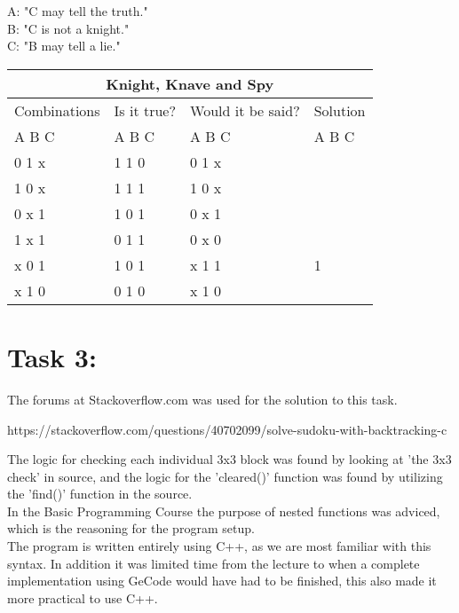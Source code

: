 \documentclass[11pt]{amsart}
\begin{document}
	A: "C may tell the truth."\\
	B: "C is not a knight."\\
	C: "B may tell a lie." \\


\begin{tabular}{ |p{3cm}||p{3cm}|p{3cm}|p{3cm}|  }
	\hline
	\multicolumn{4}{|c|}{Knight, Knave and Spy} \\
	\hline
	 Combinations & Is it true? & Would it be said? & Solution  \\ A  B  C   &   A  B  C  &   A  B  C & A  B  C \\
	\hline
	  0   1   x  	& 1	1	0   & 0 1 x	&  \\
	  1   0   x		& 1	1	1  	& 1 0 x &  \\
	  0   x   1 	&	1	0	1 	& 0 x 1	&  \\
	  1   x   1  	&	0	1	1 	& 0 x 0	&  \\
	  x   0   1		& 1	0	1  	& x 1 1	& 1\\
	  x   1   0		& 0	1	0  	& x 1 0 &  \\

	\hline
\end{tabular}


\section{Task 3:}

The forums at Stackoverflow.com was used for the solution to this task. \\
\begin{thebibliography}{99}
https://stackoverflow.com/questions/40702099/solve-sudoku-with-backtracking-c
\end{thebibliography}
The logic for checking each individual 3x3 block was found by looking at 'the 3x3 check' in source,
and the logic for the 'cleared()' function was found by utilizing the 'find()' function in the source. \\
In the Basic Programming Course the purpose of nested functions was adviced, which is the reasoning for
the program setup. \\

The program is written entirely using C++, as we are most familiar with this syntax.
In addition it was limited time from the lecture to when a complete
implementation using GeCode would have had to be finished, this also made it more practical to use C++. \\
\end{document}
